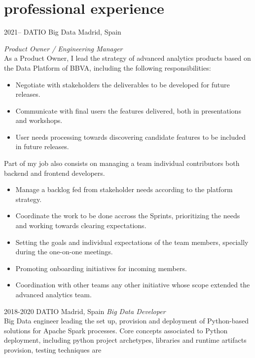 \documentclass[]{friggeri-cv}
\begin{document}
\clearpage
\section{professional experience}

\begin{entrylist}
\entry
{2021--}
{DATIO Big Data}
{Madrid, Spain}
{\emph{Product Owner / Engineering Manager} \\
As a Product Owner, I lead the strategy of advanced analytics products based on the Data Platform of BBVA, including the following responsibilities:
\begin{itemize}
  \item Negotiate with stakeholders the deliverables to be developed for future releases.
  \item Communicate with final users the features delivered, both in presentations and workshops.
  \item User needs processing towards discovering candidate features to be included in future releases.
\end{itemize}
Part of my job also consists on managing a team individual contributors both backend and frontend developers.
\begin{itemize}
  \item Manage a backlog fed from stakeholder needs according to the platform strategy.
  \item Coordinate the work to be done accross the Sprints, prioritizing the needs and working towards clearing expectations.
  \item Setting the goals and individual expectations of the team members, specially during the one-on-one meetings.
  \item Promoting onboarding initiatives for incoming members.
  \item Coordination with other teams any other initiative whose scope extended the advanced analytics team.
\end{itemize}}
\entry
{2018-2020}
{DATIO}
{Madrid, Spain}
{\emph{Big Data Developer} \\
Big Data engineer leading the set up, provision and deployment of Python-based solutions for Apache Spark processes.
Core concepts associated to Python deployment, including python project archetypes, libraries and runtime artifacts provision, testing techniques are
}
\end{entrylist}
\end{document}

